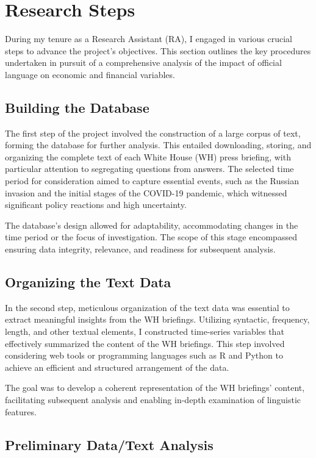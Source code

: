 \documentclass{article}
\begin{document}
\section{Research Steps}

During my tenure as a Research Assistant (RA), I engaged in various crucial steps to advance the project's objectives. This section outlines the key procedures undertaken in pursuit of a comprehensive analysis of the impact of official language on economic and financial variables.

\subsection{Building the Database}

The first step of the project involved the construction of a large corpus of text, forming the database for further analysis. This entailed downloading, storing, and organizing the complete text of each White House (WH) press briefing, with particular attention to segregating questions from answers. The selected time period for consideration aimed to capture essential events, such as the Russian invasion and the initial stages of the COVID-19 pandemic, which witnessed significant policy reactions and high uncertainty.
\par
The database's design allowed for adaptability, accommodating changes in the time period or the focus of investigation. The scope of this stage encompassed ensuring data integrity, relevance, and readiness for subsequent analysis.

\subsection{Organizing the Text Data}

In the second step, meticulous organization of the text data was essential to extract meaningful insights from the WH briefings. Utilizing syntactic, frequency, length, and other textual elements, I constructed time-series variables that effectively summarized the content of the WH briefings. This step involved considering web tools or programming languages such as R and Python to achieve an efficient and structured arrangement of the data.
\par
The goal was to develop a coherent representation of the WH briefings' content, facilitating subsequent analysis and enabling in-depth examination of linguistic features.

\subsection{Preliminary Data/Text Analysis}
\end{document}
